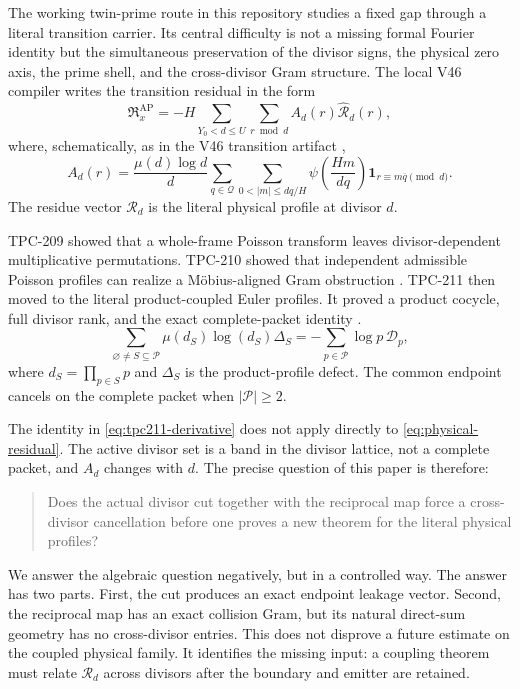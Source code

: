 \documentclass[11pt]{article}
\theoremstyle{definition}
\theoremstyle{remark}
\newcommand{\PP}{\mathcal P}
\newcommand{\muM}{\mu}
\begin{document}
The working twin-prime route in this repository studies a fixed gap through a
literal transition carrier.  Its central difficulty is not a missing formal
Fourier identity but the simultaneous preservation of the divisor signs, the
physical zero axis, the prime shell, and the cross-divisor Gram structure.  The
local V46 compiler writes the transition residual in the form
\begin{equation}
 \mathfrak R^{\mathrm{AP}}_x
 =-H\sum_{Y_0<d\leq U}\sum_{r\bmod d}
 A_d(r)\widehat{\mathcal R}_d(r),
 \label{eq:physical-residual}
\end{equation}
where, schematically, as in the V46 transition artifact \cite{WangV46},
\begin{equation}
 A_d(r)=\frac{\muM(d)\log d}{d}
 \sum_{q\in\mathcal Q}\sum_{0<|m|\leq dq/H}
 \psi\!\left(\frac{Hm}{dq}\right)
 \mathbf 1_{r\equiv m\overline q\pmod d}.
 \label{eq:emitter}
\end{equation}
The residue vector $\mathcal R_d$ is the literal physical profile at divisor $d$.

TPC-209 showed that a whole-frame Poisson transform leaves divisor-dependent
multiplicative permutations.  TPC-210 showed that independent admissible Poisson
profiles can realize a M\"obius-aligned Gram obstruction \cite{WangTPC210}.  TPC-211 then moved to the
literal product-coupled Euler profiles.  It proved a product cocycle, full divisor
rank, and the exact complete-packet identity \cite{WangTPC211}.
\begin{equation}
 \sum_{\varnothing\ne S\subseteq\PP}
 \muM(d_S)\log(d_S)\Delta_S
 =-\sum_{p\in\PP}\log p\,\mathcal D_p,
 \label{eq:tpc211-derivative}
\end{equation}
where $d_S=\prod_{p\in S}p$ and $\Delta_S$ is the product-profile defect.
The common endpoint cancels on the complete packet when $|\PP|\geq 2$.

The identity in \eqref{eq:tpc211-derivative} does not apply directly to
\eqref{eq:physical-residual}.  The active divisor set is a band in the divisor
lattice, not a complete packet, and $A_d$ changes with $d$.  The precise question
of this paper is therefore:

\begin{quote}
Does the actual divisor cut together with the reciprocal map force a
cross-divisor cancellation before one proves a new theorem for the literal
physical profiles?
\end{quote}

We answer the algebraic question negatively, but in a controlled way.  The answer
has two parts.  First, the cut produces an exact endpoint leakage vector.  Second,
the reciprocal map has an exact collision Gram, but its natural direct-sum geometry
has no cross-divisor entries.  This does not disprove a future estimate on the
coupled physical family.  It identifies the missing input: a coupling theorem must
relate $\mathcal R_d$ across divisors after the boundary and emitter are retained.
\end{document}
